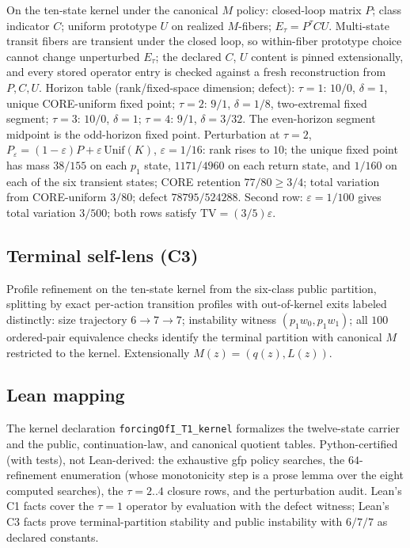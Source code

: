 \documentclass[11pt]{article}
\theoremstyle{definition}
\begin{document}
On the ten-state kernel under the canonical $M$ policy: closed-loop matrix
$P$; class indicator $C$; uniform prototype $U$ on realized $M$-fibers;
$E_\tau = P^\tau C U$. Multi-state transit fibers are transient under the
closed loop, so within-fiber prototype choice cannot change unperturbed
$E_\tau$; the declared $C$, $U$ content is pinned extensionally, and every
stored operator entry is checked against a fresh reconstruction from
$P, C, U$. Horizon table (rank/fixed-space dimension; defect): $\tau = 1$:
$10/0$, $\delta = 1$, unique CORE-uniform fixed point; $\tau = 2$: $9/1$,
$\delta = 1/8$, two-extremal fixed segment; $\tau = 3$: $10/0$, $\delta = 1$;
$\tau = 4$: $9/1$, $\delta = 3/32$. The even-horizon segment midpoint is the
odd-horizon fixed point. Perturbation at $\tau = 2$,
$P_\varepsilon = (1-\varepsilon)P + \varepsilon\,\mathrm{Unif}(K)$,
$\varepsilon = 1/16$: rank rises to $10$; the unique fixed point has mass
$38/155$ on each $p_1$ state, $1171/4960$ on each return state, and $1/160$
on each of the six transient states; CORE retention $77/80 \ge 3/4$; total
variation from CORE-uniform $3/80$; defect $78795/524288$. Second row:
$\varepsilon = 1/100$ gives total variation $3/500$; both rows satisfy
$\mathrm{TV} = (3/5)\varepsilon$.

\subsection{Terminal self-lens (C3)}

Profile refinement on the ten-state kernel from the six-class public
partition, splitting by exact per-action transition profiles with
out-of-kernel exits labeled distinctly: size trajectory $6 \to 7 \to 7$;
instability witness $(p_1w_0, p_1w_1)$; all $100$ ordered-pair equivalence
checks identify the terminal partition with canonical $M$ restricted to the
kernel. Extensionally $M(z) = (q(z), L(z))$.

\subsection{Lean mapping}

The kernel declaration \texttt{forcingOfI\_T1\_kernel} formalizes the
twelve-state carrier and the public, continuation-law, and canonical quotient
tables. Python-certified (with tests), not Lean-derived: the exhaustive gfp
policy searches, the $64$-refinement enumeration (whose monotonicity step is
a prose lemma over the eight computed searches), the $\tau = 2..4$ closure
rows, and the perturbation audit. Lean's C1 facts cover the $\tau = 1$
operator by evaluation with the defect witness; Lean's C3 facts prove
terminal-partition stability and public instability with $6/7/7$ as declared
constants.
\end{document}
